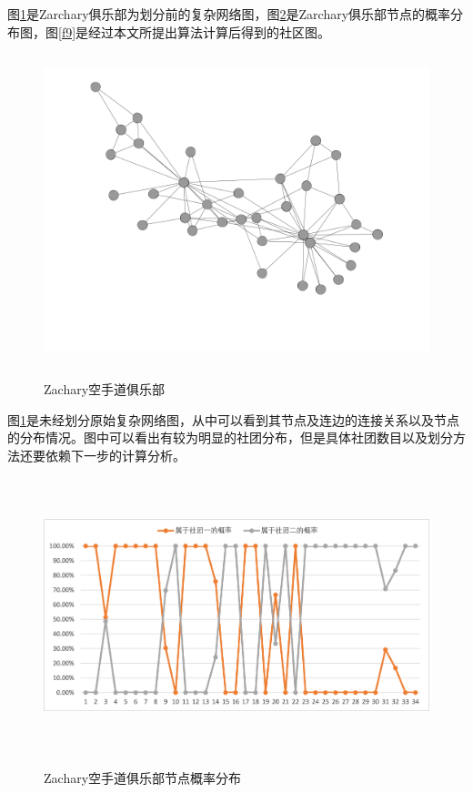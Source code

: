 \documentclass[a4paper,12pt,openany,oneside,utf-8]{ctexbook}
\begin{document}
	图\ref{f7}是Zarchary俱乐部为划分前的复杂网络图，图\ref{f8}是Zarchary俱乐部节点的概率分布图，图\ref{f9}是经过本文所提出算法计算后得到的社区图。
	
	\begin{figure}[H]
	\centering
	\includegraphics[width=120mm,height=90mm]{figure/karate-ori.png}\\
	\caption{Zachary空手道俱乐部}\label{f7}
    \end{figure}
    
	图\ref{f7}是未经划分原始复杂网络图，从中可以看到其节点及连边的连接关系以及节点的分布情况。图中可以看出有较为明显的社团分布，但是具体社团数目以及划分方法还要依赖下一步的计算分析。
	
	\begin{figure}[H]
	\centering
	\includegraphics[width=140mm,height=80mm]{figure/karate-pro.png}\\
	\caption{Zachary空手道俱乐部节点概率分布}\label{f8}
    \end{figure}
	
\end{document}

